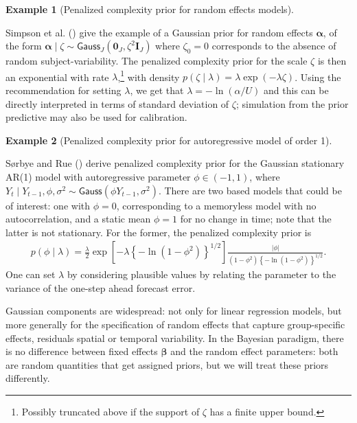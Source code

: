 \documentclass[
  11pt,
  letterpaper,
]{scrbook}
\theoremstyle{definition}
\theoremstyle{plain}
\theoremstyle{plain}
\theoremstyle{definition}
\newtheorem{example}{Example}[chapter]
\theoremstyle{definition}
\theoremstyle{remark}
\begin{document}
\begin{example}[Penalized complexity prior for random effects
models]\protect\hypertarget{exm-pcprior-randomeffect}{}\label{exm-pcprior-randomeffect}

Simpson et al. () give the example of a
Gaussian prior for random effects \(\boldsymbol{\alpha}\), of the form
\(\boldsymbol{\alpha} \mid \zeta \sim \mathsf{Gauss}_J(\boldsymbol{0}_J, \zeta^2 \mathbf{I}_J)\)
where \(\zeta_0=0\) corresponds to the absence of random
subject-variability. The penalized complexity prior for the scale
\(\zeta\) is then an exponential with rate \(\lambda\),\footnote{Possibly
  truncated above if the support of \(\zeta\) has a finite upper bound.}
with density \(p(\zeta \mid \lambda) = \lambda \exp(-\lambda \zeta)\).
Using the recommendation for setting \(\lambda\), we get that
\(\lambda = -\ln(\alpha/U)\) and this can be directly interpreted in
terms of standard deviation of \(\zeta\); simulation from the prior
predictive may also be used for calibration.

\end{example}

\begin{example}[Penalized complexity prior for autoregressive model of
order
1]\protect\hypertarget{exm-pcprior-arorder}{}\label{exm-pcprior-arorder}

Sørbye and Rue () derive penalized
complexity prior for the Gaussian stationary AR(1) model with
autoregressive parameter \(\phi \in (-1,1)\), where
\(Y_t \mid Y_{t-1}, \phi, \sigma^2 \sim \mathsf{Gauss}(\phi Y_{t-1}, \sigma^2)\).
There are two based models that could be of interest: one with
\(\phi=0\), corresponding to a memoryless model with no autocorrelation,
and a static mean \(\phi=1\) for no change in time; note that the latter
is not stationary. For the former, the penalized complexity prior is
\begin{align*}
p(\phi \mid \lambda) = \frac{\lambda}{2} \exp\left[-\lambda \left\{-\ln(1-\phi^2)\right\}^{1/2}\right] \frac{|\phi|}{(1-\phi^2)\left\{-\ln(1-\phi^2)\right\}^{1/2}}.
\end{align*} One can set \(\lambda\) by considering plausible values by
relating the parameter to the variance of the one-step ahead forecast
error.

\end{example}

Gaussian components are widespread: not only for linear regression
models, but more generally for the specification of random effects that
capture group-specific effects, residuals spatial or temporal
variability. In the Bayesian paradigm, there is no difference between
fixed effects \(\boldsymbol{\beta}\) and the random effect parameters:
both are random quantities that get assigned priors, but we will treat
these priors differently.
\end{document}
